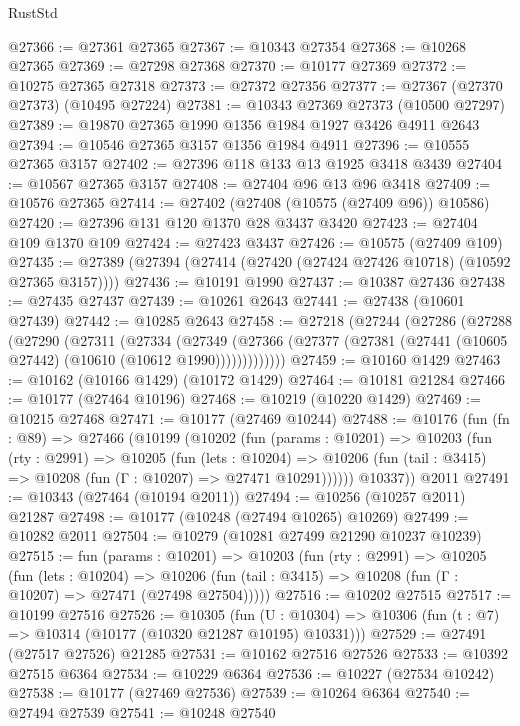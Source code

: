 \begin{lexlean}{RustStd}
\begin{coremodule}
@27366 := @27361 @27365
@27367 := @10343 @27354
@27368 := @10268 @27365
@27369 := @27298 @27368
@27370 := @10177 @27369
@27372 := @10275 @27365 @27318
@27373 := @27372 @27356
@27377 := @27367 (@27370 @27373) (@10495 @27224)
@27381 := @10343 @27369 @27373 (@10500 @27297)
@27389 := @19870 @27365 @1990 @1356 @1984 @1927 @3426 @4911 @2643
@27394 := @10546 @27365 @3157 @1356 @1984 @4911
@27396 := @10555 @27365 @3157
@27402 := @27396 @118 @133 @13 @1925 @3418 @3439
@27404 := @10567 @27365 @3157
@27408 := @27404 @96 @13 @96 @3418
@27409 := @10576 @27365
@27414 := @27402 (@27408 (@10575 (@27409 @96)) @10586)
@27420 := @27396 @131 @120 @1370 @28 @3437 @3420
@27423 := @27404 @109 @1370 @109
@27424 := @27423 @3437
@27426 := @10575 (@27409 @109)
@27435 := @27389 (@27394 (@27414 (@27420 (@27424 @27426 @10718) (@10592 @27365 @3157))))
@27436 := @10191 @1990
@27437 := @10387 @27436
@27438 := @27435 @27437
@27439 := @10261 @2643
@27441 := @27438 (@10601 @27439)
@27442 := @10285 @2643
@27458 := @27218
    (@27244
      (@27286
        (@27288
          (@27290
            (@27311
              (@27334
                (@27349
                  (@27366 (@27377 (@27381 (@27441 (@10605 @27442) (@10610 (@10612 @1990)))))))))))))
@27459 := @10160 @1429
@27463 := @10162 (@10166 @1429) (@10172 @1429)
@27464 := @10181 @21284
@27466 := @10177 (@27464 @10196)
@27468 := @10219 (@10220 @1429)
@27469 := @10215 @27468
@27471 := @10177 (@27469 @10244)
@27488 := @10176
    (fun (fn : @89) =>
    @27466
      (@10199
        (@10202
          (fun (params : @10201) =>
          @10203
            (fun (rty : @2991) =>
            @10205
              (fun (lets : @10204) =>
              @10206 (fun (tail : @3415) => @10208 (fun (Γ : @10207) => @27471 @10291))))))
        @10337))
    @2011
@27491 := @10343 (@27464 (@10194 @2011))
@27494 := @10256 (@10257 @2011) @21287
@27498 := @10177 (@10248 (@27494 @10265) @10269)
@27499 := @10282 @2011
@27504 := @10279 (@10281 @27499 @21290 @10237 @10239)
@27515 := fun (params : @10201) =>
  @10203
    (fun (rty : @2991) =>
    @10205
      (fun (lets : @10204) =>
      @10206 (fun (tail : @3415) => @10208 (fun (Γ : @10207) => @27471 (@27498 @27504)))))
@27516 := @10202 @27515
@27517 := @10199 @27516
@27526 := @10305
    (fun (U : @10304) => @10306 (fun (t : @7) => @10314 (@10177 (@10320 @21287 @10195) @10331)))
@27529 := @27491 (@27517 @27526) @21285
@27531 := @10162 @27516 @27526
@27533 := @10392 @27515 @6364
@27534 := @10229 @6364
@27536 := @10227 (@27534 @10242)
@27538 := @10177 (@27469 @27536)
@27539 := @10264 @6364
@27540 := @27494 @27539
@27541 := @10248 @27540

\end{coremodule}
\end{lexlean}
